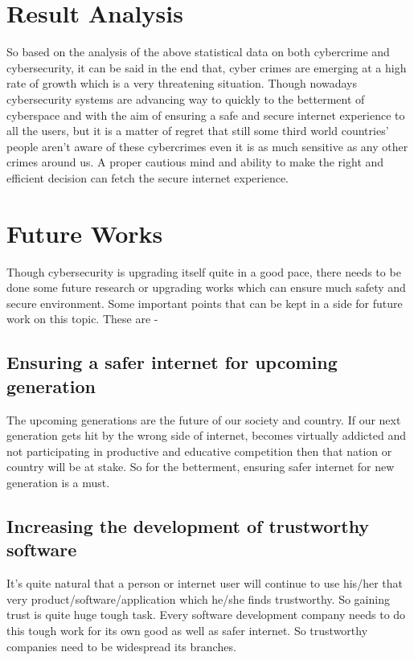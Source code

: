 \documentclass[conference]{IEEEtran}
\begin{document}
	\section{Result Analysis}
	So based on the analysis of the above statistical data on both cybercrime and cybersecurity, it can be said in the end that, cyber crimes are emerging at a high rate of growth which is a very threatening situation. Though nowadays cybersecurity systems are advancing way to quickly to the betterment of cyberspace and with the aim of ensuring a safe and secure internet experience to all the users, but it is a matter of regret that still some third world countries' people aren't aware of these cybercrimes even it is as much sensitive as any other crimes around us. A proper cautious mind and ability to make the right and efficient decision can fetch the secure internet experience.
	
	
	\section{Future Works} 
	Though cybersecurity is upgrading itself quite in a good pace, there needs to be done some future research or upgrading works which can ensure much safety and secure environment. Some important points that can be kept in a side for future work on this topic. These are -
	
	
	\subsection{Ensuring a safer internet for upcoming generation}
	The upcoming generations are the future of our society and country. If our next generation gets hit by the wrong side of internet, becomes virtually addicted and not participating in productive and educative competition then that nation or country will be at stake. So for the betterment, ensuring safer internet for new generation is a must.
	
	\subsection{Increasing the development of trustworthy software}
	It's quite natural that a person or internet user will continue to use his/her that very product/software/application which he/she finds trustworthy. So gaining trust is quite huge tough task. Every software development company needs to do this tough work for its own good as well as safer internet. So trustworthy companies need to be widespread its branches.
	
\end{document}
